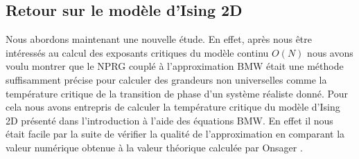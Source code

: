 \documentclass[10.5pt]{article}
\begin{document}
\begin{multicols}{2}


\newpage
\phantom{.}
\newpage


\section{Retour sur le modèle d'Ising 2D}

\label{sec:Ising}

Nous abordons maintenant une nouvelle étude. En effet, après nous être intéressés au calcul des exposants critiques du modèle continu $O(N)$ nous avons voulu montrer que le NPRG couplé à l'approximation BMW était une méthode suffisamment précise pour calculer des grandeurs non universelles comme la température critique de la transition de phase d'un système réaliste donné. Pour cela nous avons entrepris de calculer la température critique du modèle d'Ising 2D présenté dans l'introduction à l'aide des équations BMW. En effet il nous était facile par la suite de vérifier la qualité de l'approximation en comparant la valeur numérique obtenue à la valeur théorique calculée par Onsager \cite{Onsager}. \\


\end{multicols}
\end{document}
